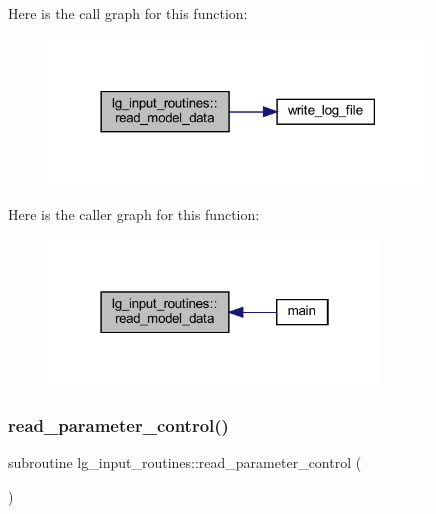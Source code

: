 Here is the call graph for this function\+:\nopagebreak
\begin{figure}[H]
\begin{center}
\leavevmode
\includegraphics[width=285pt]{namespacelg__input__routines_a39e1903280f0492197231ab5fa752f21_cgraph}
\end{center}
\end{figure}
Here is the caller graph for this function\+:\nopagebreak
\begin{figure}[H]
\begin{center}
\leavevmode
\includegraphics[width=250pt]{namespacelg__input__routines_a39e1903280f0492197231ab5fa752f21_icgraph}
\end{center}
\end{figure}
\mbox{\label{namespacelg__input__routines_a123f91865ea388eca78b77b0d625aa8c}} 
\subsubsection{\texorpdfstring{read\+\_\+parameter\+\_\+control()}{read\_parameter\_control()}}
{\footnotesize\ttfamily subroutine lg\+\_\+input\+\_\+routines\+::read\+\_\+parameter\+\_\+control (\begin{DoxyParamCaption}{ }\end{DoxyParamCaption})}

